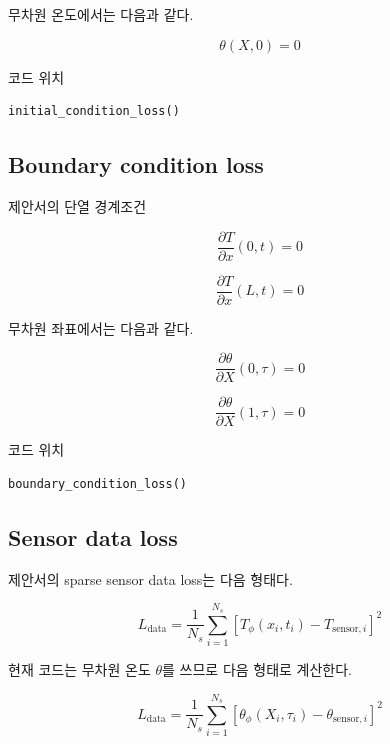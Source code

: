 \documentclass[11pt]{article}
\begin{document}
무차원 온도에서는 다음과 같다.

\begin{equation}
\theta(X,0)=0
\end{equation}

코드 위치

\begin{lstlisting}[language=Python]
initial_condition_loss()
\end{lstlisting}

\subsection{Boundary condition loss}

제안서의 단열 경계조건

\begin{equation}
\frac{\partial T}{\partial x}(0,t)=0
\end{equation}

\begin{equation}
\frac{\partial T}{\partial x}(L,t)=0
\end{equation}

무차원 좌표에서는 다음과 같다.

\begin{equation}
\frac{\partial \theta}{\partial X}(0,\tau)=0
\end{equation}

\begin{equation}
\frac{\partial \theta}{\partial X}(1,\tau)=0
\end{equation}

코드 위치

\begin{lstlisting}[language=Python]
boundary_condition_loss()
\end{lstlisting}

\subsection{Sensor data loss}

제안서의 sparse sensor data loss는 다음 형태다.

\begin{equation}
L_{\mathrm{data}}
=
\frac{1}{N_s}
\sum_{i=1}^{N_s}
\left[
T_\phi(x_i,t_i)-T_{\mathrm{sensor},i}
\right]^2
\end{equation}

현재 코드는 무차원 온도 \(\theta\)를 쓰므로 다음 형태로 계산한다.

\begin{equation}
L_{\mathrm{data}}
=
\frac{1}{N_s}
\sum_{i=1}^{N_s}
\left[
\theta_\phi(X_i,\tau_i)-\theta_{\mathrm{sensor},i}
\right]^2
\end{equation}
\end{document}
